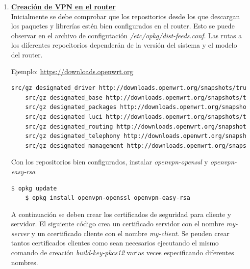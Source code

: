 \documentclass[12pt]{article}
\begin{document}
            \begin{enumerate}
                \item \textbf{\underline{Creación de VPN en el router}} \\
                    Inicialmente se debe comprobar que los repositorios desde los que descargan los paquetes y librerías estén bien configurados en el router. Esto se puede observar en el archivo de configutación \textit{/etc/opkg/dist-feeds.conf}. Las rutas a los diferentes repocitorios dependerán de la versión del sistema y el modelo del router.

                    Ejemplo:
                    \url{https://downloads.openwrt.org}

                    \begin{lstlisting}[language=bash]
    src/gz designated_driver http://downloads.openwrt.org/snapshots/trunk/brcm63xx/smp/packages/packages
    src/gz designated_base http://downloads.openwrt.org/snapshots/trunk/brcm63xx/smp/packages/base
    src/gz designated_packages http://downloads.openwrt.org/snapshots/trunk/brcm63xx/smp/packages/packages
    src/gz designated_luci http://downloads.openwrt.org/snapshots/trunk/brcm63xx/smp/packages/luci
    src/gz designated_routing http://downloads.openwrt.org/snapshots/trunk/brcm63xx/smp/packages/routing
    src/gz designated_telephony http://downloads.openwrt.org/snapshots/trunk/brcm63xx/smp/packages/telephony
    src/gz designated_management http://downloads.openwrt.org/snapshots/trunk/brcm63xx/smp/packages/management
                    \end{lstlisting}
                    
                    Con los repositorios bien configurados, instalar \textit{openvpn-openssl} y \textit{openvpn-easy-rsa}
                    
                    \begin{lstlisting}[language=bash]
    $ opkg update
    $ opkg install openvpn-openssl openvpn-easy-rsa
                    \end{lstlisting}

                    A continuación se deben crear los certificados de seguridad para cliente y servidor. El siguiente código crea un certificado servidor con el nombre \textit{my-server} y un ccertificado cliente con el nombre \textit{my-client}. Se peuden crear tantos certificados clientes como sean necesarios ejecutando el mismo comando de creación \textit{build-key-pkcs12} varias veces especificando diferentes nombres.


\end{enumerate}
\end{document}
